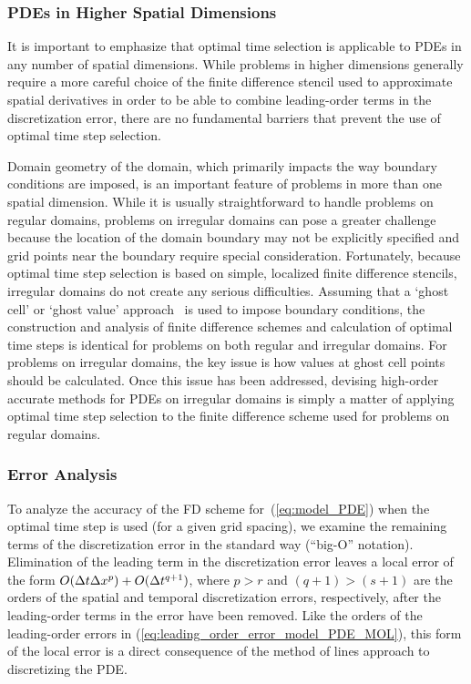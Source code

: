 \documentclass[oneeqnum,onefignum,onetabnum,onethmnum]{siamltex}
\begin{document}
\subsubsection*{PDEs in Higher Spatial Dimensions 
                \label{sec:ots_higher_spatial_dims}}
It is important to emphasize that optimal time selection is applicable to 
PDEs in any number of spatial dimensions.  While problems in higher dimensions 
generally require a more careful choice of the finite difference stencil used 
to approximate spatial derivatives in order to be able to combine 
leading-order terms in the discretization error, there are no fundamental 
barriers that prevent the use of optimal time step selection.

Domain geometry of the domain, which primarily impacts the way boundary 
conditions are imposed, is an important feature of problems in more than one 
spatial dimension.  While it is usually straightforward to handle problems on 
regular domains, problems on irregular domains can pose a greater challenge 
because the location of the domain boundary may not be explicitly specified
and grid points near the boundary require special consideration.  Fortunately, 
because optimal time step selection is based on simple, localized finite 
difference stencils, irregular domains do not create any serious difficulties.  
Assuming that a `ghost cell' or `ghost value' 
approach~\cite{fedkiw_1999, osher_fedkiw_book, gibou_2005} 
is used to impose boundary conditions, the construction and analysis of finite 
difference schemes and calculation of optimal time steps is identical for 
problems on both regular and irregular domains.  For problems on 
irregular domains, the key issue is how values at ghost cell points should 
be calculated.  Once this issue has been addressed, devising high-order 
accurate methods for PDEs on irregular domains is simply a matter of applying 
optimal time step selection to the finite difference scheme used for problems 
on regular domains. 


\subsubsection*{\label{sec:error_analysis} 
            Error Analysis}
To analyze the accuracy of the FD scheme for~(\ref{eq:model_PDE}) when the 
optimal time step is used (for a given grid spacing), we examine the remaining 
terms of the discretization error in the standard way (\ie ``big-O'' notation).
Elimination of the leading term in the discretization error leaves a local 
error of the form $O(\Delta t \Delta x^p) + O(\Delta t^{q+1})$, where $p>r$ 
and $(q+1) > (s+1)$ are the orders of the spatial and temporal discretization 
errors, respectively, after the leading-order terms in the error have been 
removed.  Like the orders of the leading-order errors in 
(\ref{eq:leading_order_error_model_PDE_MOL}), this form of the local 
error is a direct consequence of the method of lines approach to discretizing 
the PDE.  
\end{document}
